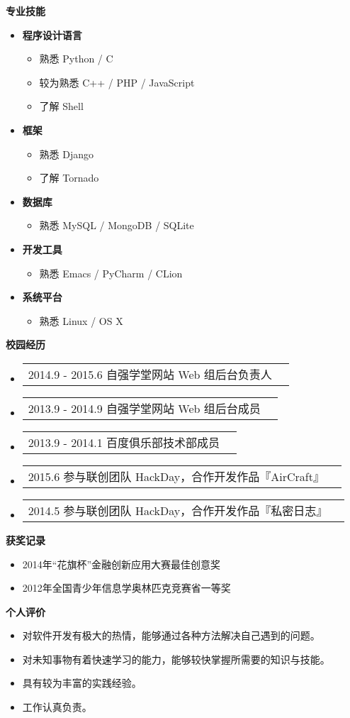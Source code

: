 \documentclass[a4paper,9pt]{article}
\makeatletter
\newcommand{\resheading}[1]{{\large \colorbox{mygrey}{\begin{minipage}{\textwidth}{\textbf{#1 \vphantom{p\^{E}}}}\end{minipage}}}}
\newcommand{\ressubnormal}[2]{
  \begin{tabular*}{172mm}{l@{\extracolsep{\fill}}r}
    \textnormal{#1} & #2
  \end{tabular*}\vspace{0pt}}
\makeatother
\begin{document}
\newpage

\resheading{专业技能}
\begin{multicols}{2}
  \begin{itemize}
  \item
    \textbf{程序设计语言}
    \begin{itemize}
    \item{熟悉 Python / C}
    \item{较为熟悉 C++ / PHP / JavaScript}
    \item{了解 Shell}
    \end{itemize}
  \item
    \textbf{框架}
    \begin{itemize}
    \item{熟悉 Django}
    \item{了解 Tornado}
    \end{itemize}
  \item
    \textbf{数据库}
    \begin{itemize}
    \item{熟悉 MySQL / MongoDB / SQLite}
    \end{itemize}
  \item
    \textbf{开发工具}
    \begin{itemize}
    \item{熟悉 Emacs / PyCharm / CLion}
    \end{itemize}
  \item
    \textbf{系统平台}
    \begin{itemize}
    \item{熟悉 Linux / OS X}
    \end{itemize}
  \end{itemize}
\end{multicols}

\resheading{校园经历}

\begin{itemize}
\item \ressubnormal{2014.9 - 2015.6 自强学堂网站 Web 组后台负责人}{}
\item \ressubnormal{2013.9 - 2014.9 自强学堂网站 Web 组后台成员}{}
\item \ressubnormal{2013.9 - 2014.1 百度俱乐部技术部成员}{}
\item \ressubnormal{2015.6 参与联创团队 HackDay，合作开发作品『AirCraft』 \color{link}{https://github.com/doraemonext/aircraft-server/}}{}
\item \ressubnormal{2014.5 参与联创团队 HackDay，合作开发作品『私密日志』 \color{link}{https://github.com/doraemonext/hackday/}}{}
\end{itemize}

\resheading{获奖记录}

\begin{itemize}
\item{2014年“花旗杯”金融创新应用大赛最佳创意奖}
\item{2012年全国青少年信息学奥林匹克竞赛省一等奖}
\end{itemize}

\resheading{个人评价}

\begin{itemize}
\item{对软件开发有极大的热情，能够通过各种方法解决自己遇到的问题。}
\item{对未知事物有着快速学习的能力，能够较快掌握所需要的知识与技能。}
\item{具有较为丰富的实践经验。}
\item{工作认真负责。}
\end{itemize}
\end{document}
